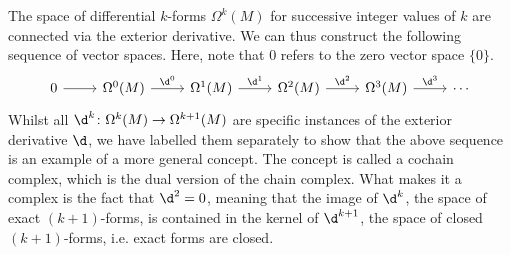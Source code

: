 \documentclass[a4paper,12pt]{article}
\begin{document}
The space of differential $k$-forms $\Omega^k(M)$ for successive integer values of $k$ are connected via the exterior derivative.
We can thus construct the following sequence of vector spaces.
Here, note that 0 refers to the zero vector space $\{0\}$.
\[\begin{tikzcd}
	0 & {\Omega^0(M)} & {\Omega^1(M)} & {\Omega^2(M)} & {\Omega^3(M)} & \cdots
	\arrow[from=1-1, to=1-2]
	\arrow["{\d^0}", from=1-2, to=1-3]
	\arrow["{\d^1}", from=1-3, to=1-4]
	\arrow["{\d^2}", from=1-4, to=1-5]
	\arrow["{\d^3}", from=1-5, to=1-6]
\end{tikzcd}\]
Whilst all $\d^k \colon \Omega^k(M) \to \Omega^{k+1}(M)$ are specific instances of the exterior derivative $\d$, we have labelled them separately to show that the above sequence is an example of a more general concept.
The concept is called a cochain complex, which is the dual version of the chain complex.
What makes it a complex is the fact that $\d^2 = 0$, meaning that the image of $\d^k$, the space of exact $(k+1)$-forms, is contained in the kernel of $\d^{k+1}$, the space of closed $(k+1)$-forms, i.e. exact forms are closed.
\end{document}
